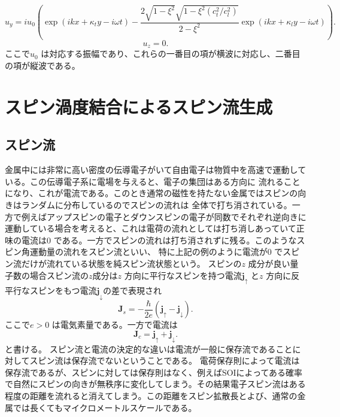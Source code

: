 \documentclass[dvipdfmx]{jsreport}
\numberwithin{equation}{chapter}
\numberwithin{table}{chapter}
\begin{document}
\begin{equation}
\label{eq:75}
	u_y=iu_0\left( \exp (ikx+\kappa_t y-i\omega t)-\frac{2\sqrt{1-\xi^2} \sqrt{1-\xi^2(c_t^2 / c_l^2)} }{2-\xi^2}\exp (ikx+\kappa_ly-i\omega t) \right) 
.\end{equation}
\begin{equation}
\label{eq:76}
	u_z=0
.\end{equation}
ここで$u_0$ は対応する振幅であり、これらの一番目の項が横波に対応し、二番目の項が縦波である。
\section{スピン渦度結合によるスピン流生成}
\subsection{スピン流}
金属中には非常に高い密度の伝導電子がいて自由電子は物質中を高速で運動している。この伝導電子系に電場を与えると、電子の集団はある方向に
流れることになり、これが電流である。このとき通常の磁性を持たない金属ではスピンの向きはランダムに分布しているのでスピンの流れは
全体で打ち消されている。一方で例えばアップスピンの電子とダウンスピンの電子が同数でそれぞれ逆向きに運動している場合を考えると、これは電荷の流れとしては打ち消しあっていて正味の電流は$0$ である。一方でスピンの流れは打ち消されずに残る。このようなスピン角運動量の流れをスピン流といい、
特に上記の例のように電流が$0$ でスピン流だけが流れている状態を純スピン流状態という。
スピンの$z$ 成分が良い量子数の場合スピン流の$z$成分は$z$ 方向に平行なスピンを持つ電流$\bm{j}_{\uparrow}$ と$z$ 方向に反平行なスピンをもつ電流$\bm{j}_{\downarrow}$の差で表現され
\begin{equation}
\label{eq:77}
	\bm{J}_s=-\frac{\hbar}{2e}(\bm{j}_{\uparrow}-\bm{j}_{\downarrow})
.\end{equation}
ここで$e>0$ は電気素量である。一方で電流は
\begin{equation}
\label{eq:78}
	\bm{J}_c=\bm{j}_{\uparrow}+\bm{j}_{\downarrow}
.\end{equation}
と書ける。
スピン流と電流の決定的な違いは電流が一般に保存流であることに対してスピン流は保存流でないということである。
電荷保存則によって電流は保存流であるが、スピンに対しては保存則はなく、例えばSOIによってある確率で自然にスピンの向きが無秩序に変化してしまう。その結果電子スピン流はある程度の距離を流れると消えてしまう。この距離をスピン拡散長とよび、通常の金属では長くてもマイクロメートルスケールである。
\end{document}
